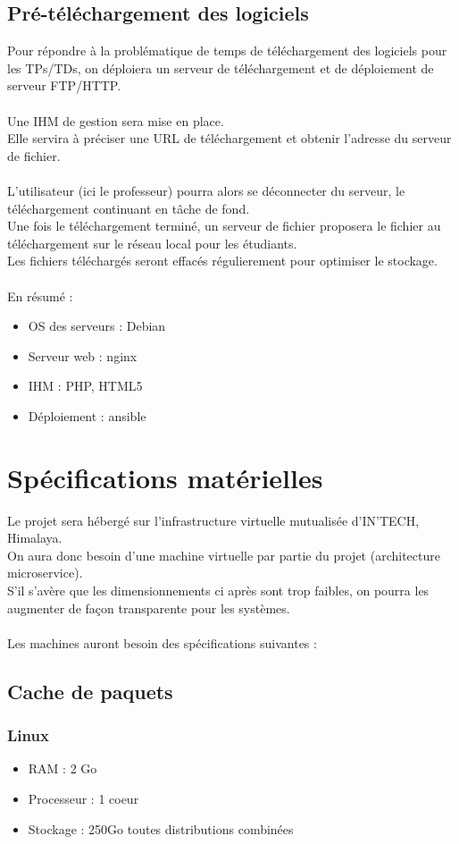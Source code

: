 \documentclass[14pt,a4paper]{extarticle}
\begin{document}
\subsection{Pré-téléchargement des logiciels}
Pour répondre à la problématique de temps de téléchargement des logiciels pour les TPs/TDs, on déploiera un serveur de téléchargement et de déploiement de serveur FTP/HTTP.\\\\
Une IHM de gestion sera mise en place.\\
Elle servira à préciser une URL de téléchargement et obtenir l'adresse du serveur de fichier. \\\\
L'utilisateur (ici le professeur) pourra alors se déconnecter du serveur, le téléchargement continuant en tâche de fond.\\
Une fois le téléchargement terminé, un serveur de fichier proposera le fichier au téléchargement sur le réseau local pour les étudiants. \\
Les fichiers téléchargés seront effacés régulierement pour optimiser le stockage. \\\\
En résumé :
\begin{itemize}
    \item{OS des serveurs  : Debian}
    \item{Serveur web : nginx}
    \item{IHM  : PHP, HTML5}
    \item{Déploiement : ansible}
\end{itemize}
\break
\section{Spécifications matérielles}
Le projet sera hébergé sur l'infrastructure virtuelle mutualisée d'IN'TECH, Himalaya.\\
On aura donc besoin d'une machine virtuelle par partie du projet (architecture microservice). \\
S'il s'avère que les dimensionnements ci après sont trop faibles, on pourra les augmenter de façon transparente pour les systèmes.\\\\
Les machines auront besoin des spécifications suivantes :
\subsection{Cache de paquets}
\subsubsection{Linux}
\begin{itemize}
    \item{RAM : 2 Go}
    \item{Processeur : 1 coeur}
    \item{Stockage : 250Go toutes distributions combinées}
\end{itemize}
\end{document}
